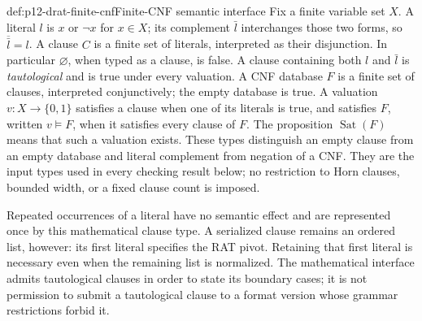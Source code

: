 \begin{hbdefinition}{def:p12-drat-finite-cnf}{Finite-CNF semantic interface}
Fix a finite variable set \(X\).  A literal \(l\) is \(x\) or \(\neg x\)
for \(x\in X\); its complement \(\bar l\) interchanges those two forms, so
\(\overline{\bar l}=l\).  A clause \(C\) is a finite set of literals,
interpreted as their disjunction.  In particular \(\varnothing\), when typed
as a clause, is false.  A clause containing both \(l\) and \(\bar l\) is
\emph{tautological} and is true under every valuation.  A CNF database \(F\)
is a finite set of clauses, interpreted conjunctively; the empty database is
true.  A valuation \(v:X\to\{0,1\}\) satisfies a clause when one of its
literals is true, and satisfies \(F\), written \(v\models F\), when it
satisfies every clause of \(F\).  The proposition \(\operatorname{Sat}(F)\)
means that such a valuation exists.  These types distinguish an empty clause
from an empty database and literal complement from negation of a CNF.  They
are the input types used in every checking result below; no restriction to
Horn clauses, bounded width, or a fixed clause count is imposed.

Repeated occurrences of a literal have no semantic effect and are represented
once by this mathematical clause type.  A serialized clause remains an
ordered list, however: its first literal specifies the RAT pivot.  Retaining
that first literal is necessary even when the remaining list is normalized.
The mathematical interface admits tautological clauses in order to state its
boundary cases; it is not permission to submit a tautological clause to a
format version whose grammar restrictions forbid it.
\end{hbdefinition}

